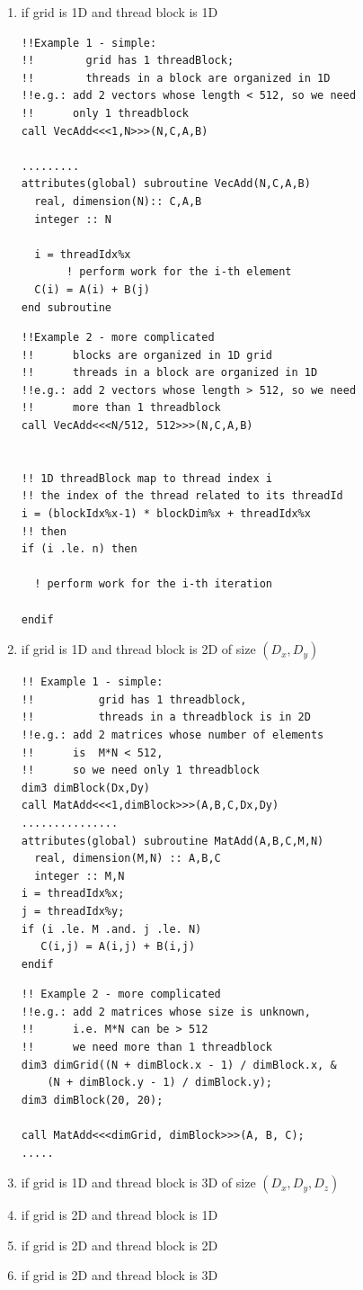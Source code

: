\begin{enumerate}
\item if grid is 1D and thread block is 1D
\begin{lstlisting}
!!Example 1 - simple: 
!!        grid has 1 threadBlock; 
!!        threads in a block are organized in 1D
!!e.g.: add 2 vectors whose length < 512, so we need 
!!      only 1 threadblock
call VecAdd<<<1,N>>>(N,C,A,B)

.........
attributes(global) subroutine VecAdd(N,C,A,B)
  real, dimension(N):: C,A,B
  integer :: N
  
  i = threadIdx%x
       ! perform work for the i-th element
  C(i) = A(i) + B(j)
end subroutine
\end{lstlisting}

\begin{lstlisting}
!!Example 2 - more complicated
!!      blocks are organized in 1D grid
!!      threads in a block are organized in 1D
!!e.g.: add 2 vectors whose length > 512, so we need 
!!      more than 1 threadblock
call VecAdd<<<N/512, 512>>>(N,C,A,B)


!! 1D threadBlock map to thread index i
!! the index of the thread related to its threadId
i = (blockIdx%x-1) * blockDim%x + threadIdx%x
!! then
if (i .le. n) then

  ! perform work for the i-th iteration

endif
\end{lstlisting}

\item if grid is 1D and thread block is 2D of size $(D_x,D_y)$
\begin{lstlisting}
!! Example 1 - simple:
!!          grid has 1 threadblock, 
!!          threads in a threadblock is in 2D
!!e.g.: add 2 matrices whose number of elements
!!      is  M*N < 512, 
!!      so we need only 1 threadblock
dim3 dimBlock(Dx,Dy) 
call MatAdd<<<1,dimBlock>>>(A,B,C,Dx,Dy)
...............
attributes(global) subroutine MatAdd(A,B,C,M,N)
  real, dimension(M,N) :: A,B,C
  integer :: M,N
i = threadIdx%x;
j = threadIdx%y;
if (i .le. M .and. j .le. N)
   C(i,j) = A(i,j) + B(i,j)
endif
\end{lstlisting}

\begin{lstlisting}
!! Example 2 - more complicated
!!e.g.: add 2 matrices whose size is unknown, 
!!      i.e. M*N can be > 512
!!      we need more than 1 threadblock
dim3 dimGrid((N + dimBlock.x - 1) / dimBlock.x, &
    (N + dimBlock.y - 1) / dimBlock.y);
dim3 dimBlock(20, 20);

call MatAdd<<<dimGrid, dimBlock>>>(A, B, C);
.....

\end{lstlisting}

\item if grid is 1D and thread block is 3D of size $(D_x,D_y,D_z)$
\item if grid is 2D and thread block is 1D
\item if grid is 2D and thread block is 2D
\item if grid is 2D and thread block is 3D
\end{enumerate}

